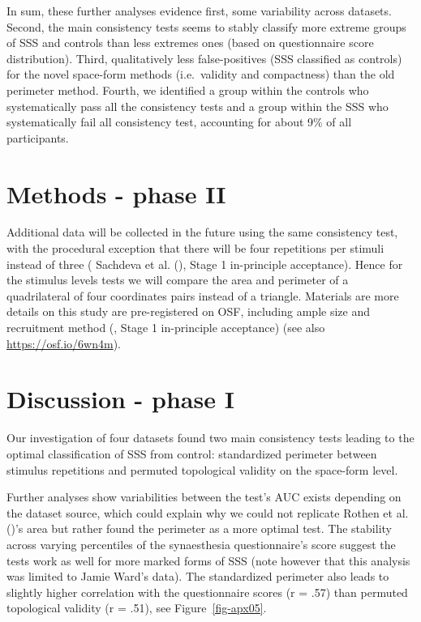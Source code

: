 \documentclass[
  man,
  floatsintext,
  longtable,
  a4paper,
  nolmodern,
  notxfonts,
  notimes,
  colorlinks=true,linkcolor=blue,citecolor=blue,urlcolor=blue]{apa7}
\begin{document}
In sum, these further analyses evidence first, some variability across
datasets. Second, the main consistency tests seems to stably classify
more extreme groups of SSS and controls than less extremes ones (based
on questionnaire score distribution). Third, qualitatively less
false-positives (SSS classified as controls) for the novel space-form
methods (i.e.~validity and compactness) than the old perimeter method.
Fourth, we identified a group within the controls who systematically
pass all the consistency tests and a group within the SSS who
systematically fail all consistency test, accounting for about 9\% of
all participants.

\section{Methods - phase II}\label{sec-phase-ii-methods}

Additional data will be collected in the future using the same
consistency test, with the procedural exception that there will be four
repetitions per stimuli instead of three ( Sachdeva et al.
(), Stage 1 in-principle acceptance).
Hence for the stimulus levels tests we will compare the area and
perimeter of a quadrilateral of four coordinates pairs instead of a
triangle. Materials are more details on this study are pre-registered on
OSF, including ample size and recruitment method
(, Stage 1
in-principle acceptance) (see also \url{https://osf.io/6wn4m}).

\section{Discussion - phase I}\label{discussion---phase-i}


Our investigation of four datasets found two main consistency tests
leading to the optimal classification of SSS from control: standardized
perimeter between stimulus repetitions and permuted topological validity
on the space-form level.

Further analyses show variabilities between the test's AUC exists
depending on the dataset source, which could explain why we could not
replicate Rothen et al. ()'s area but
rather found the perimeter as a more optimal test. The stability across
varying percentiles of the synaesthesia questionnaire's score suggest
the tests work as well for more marked forms of SSS (note however that
this analysis was limited to Jamie Ward's data). The standardized
perimeter also leads to slightly higher correlation with the
questionnaire scores (r = .57) than permuted topological validity (r =
.51), see Figure~\ref{fig-apx05}.
\end{document}
